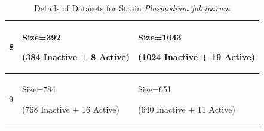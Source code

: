 \documentclass[a4paper,12pt, english]{article}
\begin{document}
\begin{itemize}
\begin{table}[h]
\begin{tabular}{ | l | l | l | }
	8 & Size=392 \begin{scriptsize}(384 Inactive + 8 Active)\end{scriptsize} & Size=1043 \begin{scriptsize}(1024 Inactive + 19 Active)\end{scriptsize}\\ \hline
	9 & Size=784 \begin{scriptsize}(768 Inactive + 16 Active)\end{scriptsize} & Size=651 \begin{scriptsize}(640 Inactive + 11 Active)\end{scriptsize}\\ \hline
    \end{tabular}       
    \caption{Details of Datasets for Strain \emph{Plasmodium falciparum}}
\end{table}


\end{itemize}
\end{document}
